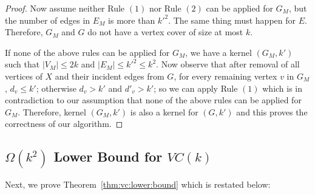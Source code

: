 \documentclass[11pt,letter]{article}
\begin{document}
\begin{proof}
 Now assume neither Rule $(1)$ nor Rule $(2)$ can be applied for $G_M$,
 but the number of edges in $E_M$ is more than $k'^2$. The same thing must
 happen for $E$. Therefore, $G_M$ and $G$ do not have a vertex cover of size
 at most $k$.

If none of the above rules can be applied for $G_M$, we have a kernel $(G_M,k')$
such that $|V_M|\le 2k$ and $|E_M|\le k'^2\le k^2$. Now observe that after removal
of all vertices of $X$ and their incident edges from $G$, for every remaining vertex $v$
in $G_M$, $d_v\le k'$; otherwise $d_v> k'$ and $d'_v> k'$; so we can apply Rule $(1)$ which is
in contradiction to our assumption that none of the above rules can be applied for $G_M$.
Therefore,  kernel $(G_M,k')$ is also a kernel for $(G,k')$ and this proves the correctness
of our algorithm.
\end{proof}


\subsection{$\Omega(k^2)$ Lower Bound for $VC(k)$}
\label{sec:vc:bound}

Next, we prove Theorem~\ref{thm:vc:lower:bound} which is restated below:
\end{document}
